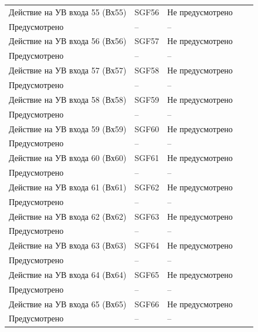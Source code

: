\begin{longtable}{|>{\centering\arraybackslash}m{5.3cm}|>{\centering\arraybackslash}m{3.3cm}|>{\centering\arraybackslash}m{4.2cm}|>{\centering\arraybackslash}m{1.8cm}|>{\centering\arraybackslash}m{1cm}|}
\hline
\centering Действие на УВ входа 55 (Вх55)  & \centering SGF56 & \centering Не предусмотрено \\ Предусмотрено & \centering -- & \centering \arraybackslash -- \\
\hline
\centering Действие на УВ входа 56 (Вх56)  & \centering SGF57 & \centering Не предусмотрено \\ Предусмотрено & \centering -- & \centering \arraybackslash -- \\
\hline
\centering Действие на УВ входа 57 (Вх57)  & \centering SGF58 & \centering Не предусмотрено \\ Предусмотрено & \centering -- & \centering \arraybackslash -- \\
\hline
\centering Действие на УВ входа 58 (Вх58)  & \centering SGF59 & \centering Не предусмотрено \\ Предусмотрено & \centering -- & \centering \arraybackslash -- \\
\hline
\centering Действие на УВ входа 59 (Вх59)  & \centering SGF60 & \centering Не предусмотрено \\ Предусмотрено & \centering -- & \centering \arraybackslash -- \\
\hline
\centering Действие на УВ входа 60 (Вх60)  & \centering SGF61 & \centering Не предусмотрено \\ Предусмотрено & \centering -- & \centering \arraybackslash -- \\
\hline
\centering Действие на УВ входа 61 (Вх61)  & \centering SGF62 & \centering Не предусмотрено \\ Предусмотрено & \centering -- & \centering \arraybackslash -- \\
\hline
\centering Действие на УВ входа 62 (Вх62)  & \centering SGF63 & \centering Не предусмотрено \\ Предусмотрено & \centering -- & \centering \arraybackslash -- \\
\hline
\centering Действие на УВ входа 63 (Вх63)  & \centering SGF64 & \centering Не предусмотрено \\ Предусмотрено & \centering -- & \centering \arraybackslash -- \\
\hline
\centering Действие на УВ входа 64 (Вх64)  & \centering SGF65 & \centering Не предусмотрено \\ Предусмотрено & \centering -- & \centering \arraybackslash -- \\
\hline
\centering Действие на УВ входа 65 (Вх65)  & \centering SGF66 & \centering Не предусмотрено \\ Предусмотрено & \centering -- & \centering \arraybackslash -- \\

\end{longtable}
